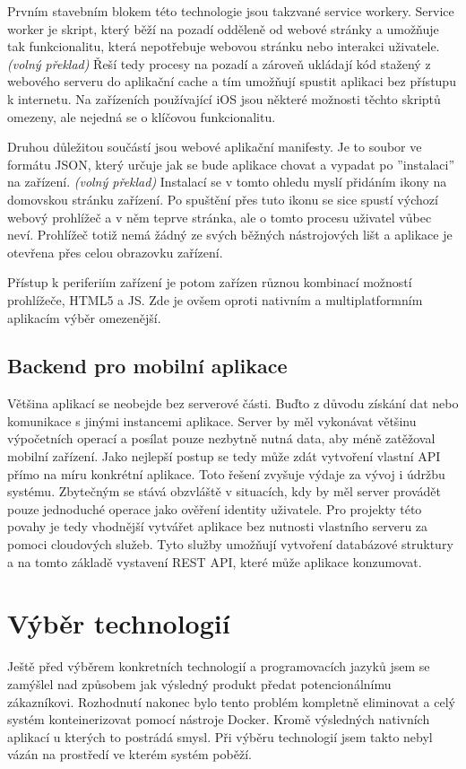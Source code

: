 \documentclass[
  biblatex,
  glossaries,
  index
]{kidiplom}
\begin{document}
Prvním stavebním blokem této technologie jsou takzvané service workery. Service worker je skript, který běží na pozadí odděleně od webové stránky a umožňuje tak funkcionalitu, která nepotřebuje webovou stránku nebo interakci uživatele. \cite{6} \textit{(volný překlad)} Řeší tedy procesy na pozadí a zároveň ukládají kód stažený z webového serveru do aplikační cache a tím umožňují spustit aplikaci bez přístupu k internetu. Na zařízeních používající iOS jsou některé možnosti těchto skriptů omezeny, ale nejedná se o klíčovou funkcionalitu.

Druhou důležitou součástí jsou webové aplikační manifesty. Je to soubor ve formátu JSON, který určuje jak se bude aplikace chovat a vypadat po ''instalaci'' na zařízení. \cite{7} \textit{(volný překlad)} Instalací se v tomto ohledu myslí přidáním ikony na domovskou stránku zařízení. Po spuštění přes tuto ikonu se sice spustí výchozí webový prohlížeč a v něm teprve stránka, ale o tomto procesu uživatel vůbec neví. Prohlížeč totiž nemá žádný ze svých běžných nástrojových lišt a aplikace je otevřena přes celou obrazovku zařízení.

Přístup k periferiím zařízení je potom zařízen různou kombinací možností prohlížeče, HTML5 a JS. Zde je ovšem oproti nativním a multiplatformním aplikacím výběr omezenější.

\subsection{Backend pro mobilní aplikace}
Většina aplikací se neobejde bez serverové části. Buďto z důvodu získání dat nebo komunikace s jinými instancemi aplikace. Server by měl vykonávat většinu výpočetních operací a posílat pouze nezbytně nutná data, aby méně zatěžoval mobilní zařízení. Jako nejlepší postup se tedy může zdát vytvoření vlastní API přímo na míru konkrétní aplikace. Toto řešení zvyšuje výdaje za vývoj i údržbu systému. Zbytečným se stává obzvláště v situacích, kdy by měl server provádět pouze jednoduché operace jako ověření identity uživatele. Pro projekty této povahy je tedy vhodnější vytvářet aplikace bez nutnosti vlastního serveru za pomoci cloudových služeb. Tyto služby umožňují vytvoření databázové struktury a na tomto základě vystavení REST API, které může aplikace konzumovat.
\newpage

\section{Výběr technologií}
Ještě před výběrem konkretních technologií a programovacích jazyků jsem se zamýšlel nad způsobem jak výsledný produkt předat potencionálnímu zákazníkovi. Rozhodnutí nakonec bylo tento problém kompletně eliminovat a celý systém konteinerizovat pomocí nástroje Docker. Kromě výsledných nativních aplikací u kterých to postrádá smysl. Při výběru technologií jsem takto nebyl vázán na prostředí ve kterém systém poběží.
\end{document}
